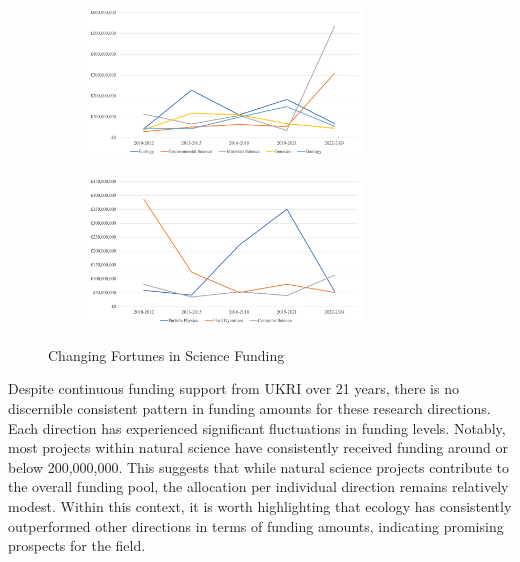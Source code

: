\begin{figure}[H]
    \centering
    \begin{subfigure}{\textwidth}
        \includegraphics[width=0.8\textwidth]{Figures/Natural Science Funding Trends.png}
       
        \label{fig:2016-2018}
    \end{subfigure}

    \begin{subfigure}{\textwidth}
        \includegraphics[width=0.8\textwidth]{Figures/Formal Science Funding Trends.png}
       
        \label{fig:2019-2021}
    \end{subfigure}
    \caption[While these directions have received consistent financial support, none of them exhibit a clear growth trend.]{Changing Fortunes in Science Funding}
    \label{fig3.8}
\end{figure}

Despite continuous funding support from UKRI over 21 years, there is no discernible consistent pattern in funding amounts for these research directions. Each direction has experienced significant fluctuations in funding levels. Notably, most projects within natural science have consistently received funding around or below 200,000,000. This suggests that while natural science projects contribute to the overall funding pool, the allocation per individual direction remains relatively modest. Within this context, it is worth highlighting that ecology has consistently outperformed other directions in terms of funding amounts, indicating promising prospects for the field.\\

